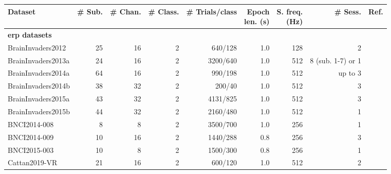 \begin{tabularx}{\linewidth}{@{}Xrrrrrrrr@{}}
	\toprule
	Dataset                    & \# Sub.         & \# Chan. & \# Class. & \# Trials/class
	                           & \makecell{Epoch                                                                                                       \\ len. (s)} & \makecell{S. freq.\\ (Hz)}
	                           & \# Sess.        & Ref.                                                                                                \\
	\midrule
	\textbf{\Ac{erp} datasets} &                 &          &           &                 &      &      &                   &                          \\
	BrainInvaders2012          & 25              & 16       & 2         & 640/128         & 1.0  & 128  & 2                 & \cite{VanVeen2019}       \\
	BrainInvaders2013a         & 24              & 16       & 2         & 3200/640        & 1.0  & 512  & 8 (sub. 1-7) or 1 & \cite{Vaineau2019}       \\
	BrainInvaders2014a         & 64              & 16       & 2         & 990/198         & 1.0  & 512  & up to 3           & \cite{Korczowski2019}    \\
	BrainInvaders2014b         & 38              & 32       & 2         & 200/40          & 1.0  & 512  & 3                 & \cite{Korczowski2019a}   \\
	BrainInvaders2015a         & 43              & 32       & 2         & 4131/825        & 1.0  & 512  & 3                 & \cite{Korczowski2019b}   \\
	BrainInvaders2015b         & 44              & 32       & 2         & 2160/480        & 1.0  & 512  & 1                 & \cite{Korczowski2019c}   \\
	BNCI2014-008               & 8               & 8        & 2         & 3500/700        & 1.0  & 256  & 1                 & \cite{Riccio2013}        \\
	BNCI2014-009               & 10              & 16       & 2         & 1440/288        & 0.8  & 256  & 3                 & \cite{Arico2014}         \\
	BNCI2015-003               & 10              & 8        & 2         & 1500/300        & 0.8  & 256  & 1                 & \cite{Guger2009}         \\
	Cattan2019-VR              & 21              & 16       & 2         & 600/120         & 1.0  & 512  & 2                 & \cite{Cattan2019}        \\

\end{tabularx}
